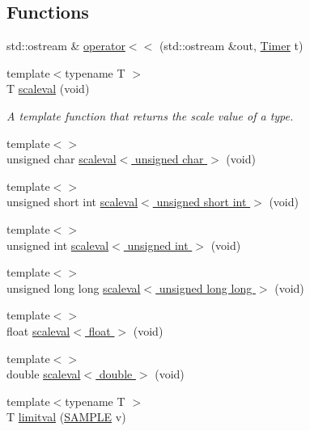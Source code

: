 \subsection*{Functions}
\begin{DoxyCompactItemize}
\item 
std\+::ostream \& \hyperlink{namespace_photo_finish_a3044516746909ba15410d161d15ee1c5}{operator$<$$<$} (std\+::ostream \&out, \hyperlink{class_photo_finish_1_1_timer}{Timer} t)
\item 
{\footnotesize template$<$typename T $>$ }\\T \hyperlink{namespace_photo_finish_a1bfb8180736f3b2786f47361d7586f2c}{scaleval} (void)
\begin{DoxyCompactList}\small\item\em A template function that returns the \textquotesingle{}scale\textquotesingle{} value of a type. \end{DoxyCompactList}\item 
{\footnotesize template$<$$>$ }\\unsigned char \hyperlink{namespace_photo_finish_a653d84177058782ef68b4c5f5c0c5acc}{scaleval$<$ unsigned char $>$} (void)
\item 
{\footnotesize template$<$$>$ }\\unsigned short int \hyperlink{namespace_photo_finish_adbb257b26d8f342162ba6dda2fc32601}{scaleval$<$ unsigned short int $>$} (void)
\item 
{\footnotesize template$<$$>$ }\\unsigned int \hyperlink{namespace_photo_finish_a82d48fcde01b1e834f627a2f6ab6befc}{scaleval$<$ unsigned int $>$} (void)
\item 
{\footnotesize template$<$$>$ }\\unsigned long long \hyperlink{namespace_photo_finish_aaaa916ac04c95a407348efa5420efd0f}{scaleval$<$ unsigned long long $>$} (void)
\item 
{\footnotesize template$<$$>$ }\\float \hyperlink{namespace_photo_finish_a5a36600ec83f00881b849f7fb26666dc}{scaleval$<$ float $>$} (void)
\item 
{\footnotesize template$<$$>$ }\\double \hyperlink{namespace_photo_finish_abfdbadb0978c56b817c27939adc53c23}{scaleval$<$ double $>$} (void)
\item 
{\footnotesize template$<$typename T $>$ }\\T \hyperlink{namespace_photo_finish_aa019419c2456e119283e24d6e6fa3cbb}{limitval} (\hyperlink{sample_8h_afc597c76b4f04a2da506a240d51d89a0}{S\+A\+M\+P\+LE} v)

\end{DoxyCompactItemize}

